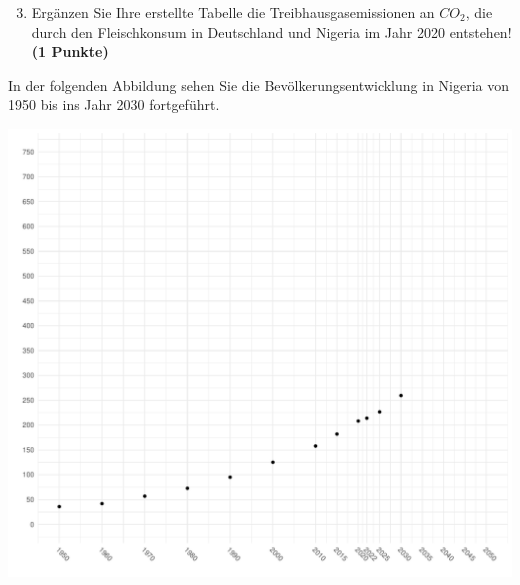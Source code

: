\documentclass[a4paper, 9pt]{scrartcl}\usepackage[]{graphicx}\usepackage[]{xcolor}
\makeatletter
\def\maxwidth{ %
  \ifdim\Gin@nat@width>\linewidth
    \linewidth
  \else
    \Gin@nat@width
  \fi
}
\newenvironment{knitrout}{}{} %
\makeatother
\begin{document}
\begin{enumerate}
  \setcounter{enumi}{2}  
\item Erg{\"a}nzen Sie Ihre erstellte Tabelle die Treibhausgasemissionen an $CO_2$, die durch den
  Fleischkonsum in Deutschland und Nigeria im Jahr 2020 entstehen!
  \textbf{(1 Punkte)}
\end{enumerate}

\newpage

In der folgenden Abbildung sehen Sie die
Bev{\"o}lkerungsentwicklung in Nigeria von 1950 bis ins Jahr 2030 fortgef{\"u}hrt.

\begin{knitrout}
\color{fgcolor}

{\centering \includegraphics[width=\maxwidth]{img/math-14-c-1} 

}


\end{knitrout}
\end{document}
